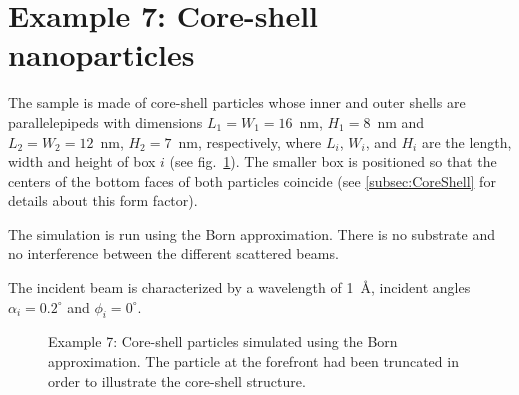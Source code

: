 \newpage
\section{Example 7: Core-shell nanoparticles}
The sample is made of core-shell particles whose inner and outer shells are parallelepipeds with dimensions  $L_1=W_1=16$~nm, $H_1=8$~nm and  $L_2=W_2=12$~nm, $H_2=7$~nm, respectively, where $L_i$, $W_i$, and $H_i$ are the length, width and height of box $i$ (see fig.~\ref{fig:PythonEx7Core}). The smaller box is positioned so that the centers of the bottom faces of both particles coincide (see \ref{subsec:CoreShell} for details about this form factor). 

The simulation is run using the Born approximation. There is no substrate and no interference between the different scattered beams.

The incident beam is characterized by a wavelength of 1~\AA, incident angles $\alpha_i=0.2^{\circ}$ and $\phi_i=0^{\circ}$.


\begin{figure}[H]
\hfill
{}
\hfill
{}
\hfill
\caption{Example 7: Core-shell particles simulated using the Born approximation. The particle at the forefront had been truncated in order to illustrate the core-shell structure.}
\label{fig:PythonEx7Core}
\end{figure}

